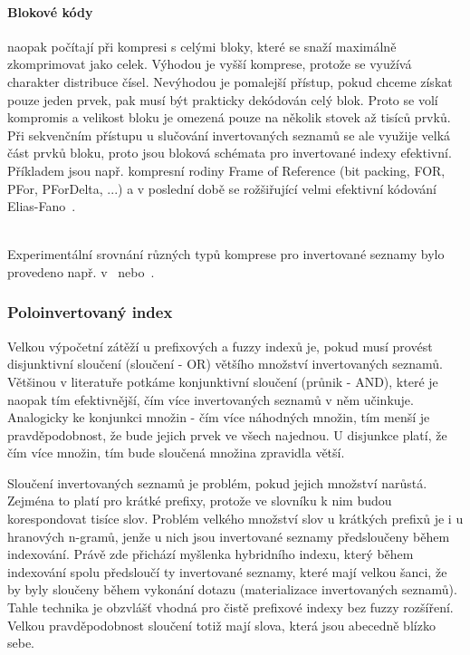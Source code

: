 \documentclass[11pt,letterpaper,oneside,openright]{book}
\begin{document}
\paragraph{Blokové kódy} naopak počítají při kompresi s celými bloky, které se
snaží maximálně zkomprimovat jako celek. Výhodou je vyšší komprese, protože se
využívá charakter distribuce čísel. Nevýhodou je pomalejší přístup, pokud
chceme získat pouze jeden prvek, pak musí být prakticky dekódován celý blok.
Proto se volí kompromis a velikost bloku je omezená pouze na několik stovek až
tisíců prvků. Při sekvenčním přístupu u slučování invertovaných seznamů se ale
využije velká část prvků bloku, proto jsou bloková schémata pro invertované
indexy efektivní. Příkladem jsou např. kompresní rodiny Frame of Reference (bit
packing, FOR, PFor, PForDelta, ...) a v poslední době se rožšiřující velmi
efektivní kódování
Elias-Fano~\cite{DBLP:journals/corr/abs-1206-4300,Curtiss:2013:USS:2536222.2536239}.

~\\
Experimentální srovnání různých typů komprese pro invertované seznamy bylo
provedeno např. v~\citep[addenda~6]{buttcher2010information}
nebo~\cite{Zhang:2008:PCI:1367497.1367550}.

\subsubsection{Poloinvertovaný index} \label{sec:half_inverted}
Velkou výpočetní zátěží u prefixových a fuzzy indexů je, pokud musí provést
disjunktivní sloučení (sloučení - OR) většího množství invertovaných seznamů.
Většinou v literatuře potkáme konjunktivní sloučení (průnik - AND), které je
naopak tím efektivnější, čím více invertovaných seznamů v něm učinkuje.
Analogicky ke konjunkci množin - čím více náhodných množin, tím menší je
pravděpodobnost, že bude jejich prvek ve všech najednou. U disjunkce platí, že
čím více množin, tím bude sloučená množina zpravidla větší.

Sloučení invertovaných seznamů je problém, pokud jejich množství narůstá.
Zejména to platí pro krátké prefixy, protože ve slovníku k nim budou
korespondovat tisíce slov. Problém velkého množství slov u krátkých prefixů je
i u hranových n-gramů, jenže u nich jsou invertované seznamy předsloučeny během
indexování. Právě zde přichází myšlenka hybridního indexu, který během
indexování spolu předsloučí ty invertované seznamy, které mají velkou šanci, že
by byly sloučeny během vykonání dotazu (materializace invertovaných seznamů).
Tahle technika je obzvlášť vhodná pro čistě prefixové indexy bez fuzzy
rozšíření. Velkou pravděpodobnost sloučení totiž mají slova, která jsou
abecedně blízko sebe.
\end{document}
